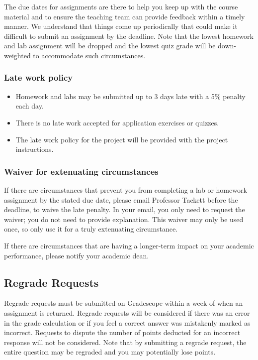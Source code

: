 \documentclass[
]{article}
\providecommand{\tightlist}{%
  \setlength{\itemsep}{0pt}\setlength{\parskip}{0pt}}
\begin{document}
The due dates for assignments are there to help you keep up with the
course material and to ensure the teaching team can provide feedback
within a timely manner. We understand that things come up periodically
that could make it difficult to submit an assignment by the deadline.
Note that the lowest homework and lab assignment will be dropped and the
lowest quiz grade will be down-weighted to accommodate such
circumstances.

\hypertarget{late-work-policy}{%
\subsubsection{Late work policy}\label{late-work-policy}}

\begin{itemize}
\tightlist
\item
  Homework and labs may be submitted up to 3 days late with a 5\%
  penalty each day.
\item
  There is no late work accepted for application exercises or quizzes.
\item
  The late work policy for the project will be provided with the project
  instructions.
\end{itemize}

\hypertarget{waiver-for-extenuating-circumstances}{%
\subsubsection{Waiver for extenuating
circumstances}\label{waiver-for-extenuating-circumstances}}

If there are circumstances that prevent you from completing a lab or
homework assignment by the stated due date, please email Professor
Tackett before the deadline, to waive the late penalty. In your email,
you only need to request the waiver; you do not need to provide
explanation. This waiver may only be used once, so only use it for a
truly extenuating circumstance.

If there are circumstances that are having a longer-term impact on your
academic performance, please notify your academic dean.

\hypertarget{regrade-requests}{%
\subsection{Regrade Requests}\label{regrade-requests}}

Regrade requests must be submitted on Gradescope within a week of when
an assignment is returned. Regrade requests will be considered if there
was an error in the grade calculation or if you feel a correct answer
was mistakenly marked as incorrect. Requests to dispute the number of
points deducted for an incorrect response will not be considered. Note
that by submitting a regrade request, the entire question may be
regraded and you may potentially lose points.
\end{document}
